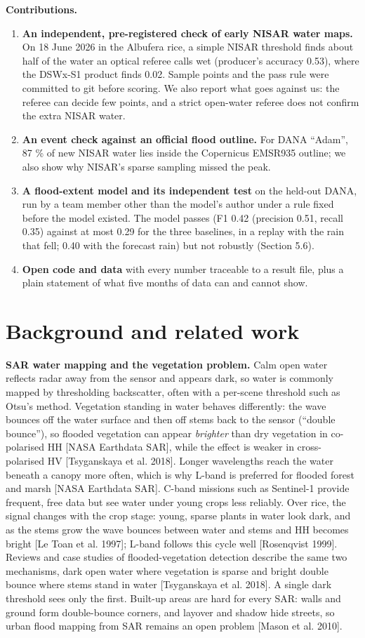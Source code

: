 \documentclass[10pt,twocolumn]{article}
\begin{document}
\textbf{Contributions.}

\begin{enumerate}
\item{} \textbf{An independent, pre-registered check of early NISAR water maps.} On 18 June 2026 in the Albufera rice, a simple NISAR threshold finds about half of the water an optical referee calls wet (producer's accuracy 0.53), where the DSWx-S1 product finds 0.02. Sample points and the pass rule were committed to git before scoring. We also report what goes against us: the referee can decide few points, and a strict open-water referee does not confirm the extra NISAR water.
\item{} \textbf{An event check against an official flood outline.} For DANA ``Adam'', 87 \% of new NISAR water lies inside the Copernicus EMSR935 outline; we also show why NISAR's sparse sampling missed the peak.
\item{} \textbf{A flood-extent model and its independent test} on the held-out DANA, run by a team member other than the model's author under a rule fixed before the model existed. The model passes (F1 0.42 (precision 0.51, recall 0.35) against at most 0.29 for the three baselines, in a replay with the rain that fell; 0.40 with the forecast rain) but not robustly (Section 5.6).
\item{} \textbf{Open code and data} with every number traceable to a result file, plus a plain statement of what five months of data can and cannot show.
\end{enumerate}
\section{Background and related work}
\textbf{SAR water mapping and the vegetation problem.} Calm open water reflects radar away from the sensor and appears dark, so water is commonly mapped by thresholding backscatter, often with a per-scene threshold such as Otsu's method. Vegetation standing in water behaves differently: the wave bounces off the water surface and then off stems back to the sensor (``double bounce''), so flooded vegetation can appear \emph{brighter} than dry vegetation in co-polarised HH [NASA Earthdata SAR], while the effect is weaker in cross-polarised HV [Tsyganskaya et al. 2018]. Longer wavelengths reach the water beneath a canopy more often, which is why L-band is preferred for flooded forest and marsh [NASA Earthdata SAR]. C-band missions such as Sentinel-1 provide frequent, free data but see water under young crops less reliably. Over rice, the signal changes with the crop stage: young, sparse plants in water look dark, and as the stems grow the wave bounces between water and stems and HH becomes bright [Le Toan et al. 1997]; L-band follows this cycle well [Rosenqvist 1999]. Reviews and case studies of flooded-vegetation detection describe the same two mechanisms, dark open water where vegetation is sparse and bright double bounce where stems stand in water [Tsyganskaya et al. 2018]. A single dark threshold sees only the first. Built-up areas are hard for every SAR: walls and ground form double-bounce corners, and layover and shadow hide streets, so urban flood mapping from SAR remains an open problem [Mason et al. 2010].
\end{document}

